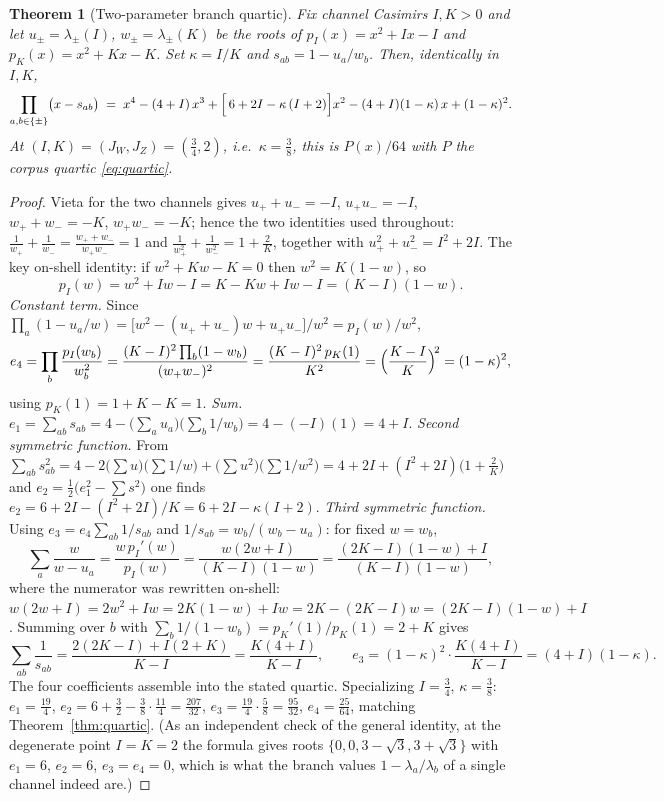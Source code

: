 \documentclass[11pt,a4paper]{article}
\newtheorem{theorem}{Theorem}
\theoremstyle{definition}
\begin{document}
\begin{theorem}[Two-parameter branch quartic]
\label{thm:family}
Fix channel Casimirs $I,K>0$ and let $u_\pm=\lambda_\pm(I)$,
$w_\pm=\lambda_\pm(K)$ be the roots of $p_I(x)=x^2+Ix-I$ and
$p_K(x)=x^2+Kx-K$. Set $\kappa=I/K$ and $s_{ab}=1-u_a/w_b$. Then,
identically in $I,K$,
\[
\prod_{a,b\in\{\pm\}}\bigl(x-s_{ab}\bigr)
\;=\;
x^4-(4+I)\,x^3
+\Bigl[\,6+2I-\kappa\,(I+2)\Bigr]x^2
-(4+I)(1-\kappa)\,x
+(1-\kappa)^2 .
\]
At $(I,K)=(J_W,J_Z)=(\tfrac34,2)$, i.e.\ $\kappa=\tfrac38$, this is
$P(x)/64$ with $P$ the corpus quartic \eqref{eq:quartic}.
\end{theorem}

\begin{proof}
Vieta for the two channels gives $u_++u_-=-I$, $u_+u_-=-I$,
$w_++w_-=-K$, $w_+w_-=-K$; hence the two identities used throughout:
$\tfrac1{w_+}+\tfrac1{w_-}=\tfrac{w_++w_-}{w_+w_-}=1$ and
$\tfrac1{w_+^2}+\tfrac1{w_-^2}=1+\tfrac2K$, together with
$u_+^2+u_-^2=I^2+2I$. The key on-shell identity: if $w^2+Kw-K=0$ then
$w^2=K(1-w)$, so
\[
p_I(w)=w^2+Iw-I=K-Kw+Iw-I=(K-I)(1-w).
\]
\emph{Constant term.} Since
$\prod_a(1-u_a/w)=\bigl[w^2-(u_++u_-)w+u_+u_-\bigr]/w^2=p_I(w)/w^2$,
\[
e_4=\prod_b\frac{p_I(w_b)}{w_b^2}
=\frac{(K-I)^2\prod_b(1-w_b)}{(w_+w_-)^2}
=\frac{(K-I)^2\,p_K(1)}{K^2}
=\Bigl(\frac{K-I}{K}\Bigr)^{\!2}=(1-\kappa)^2,
\]
using $p_K(1)=1+K-K=1$.
\emph{Sum.} $e_1=\sum_{ab}s_{ab}
=4-\bigl(\sum_a u_a\bigr)\bigl(\sum_b 1/w_b\bigr)=4-(-I)(1)=4+I$.
\emph{Second symmetric function.} From
$\sum_{ab}s_{ab}^2
=4-2\bigl(\sum u\bigr)\bigl(\sum 1/w\bigr)
+\bigl(\sum u^2\bigr)\bigl(\sum 1/w^2\bigr)
=4+2I+(I^2+2I)\bigl(1+\tfrac2K\bigr)$
and $e_2=\tfrac12\bigl(e_1^2-\sum s^2\bigr)$ one finds
$e_2=6+2I-(I^2+2I)/K=6+2I-\kappa(I+2)$.
\emph{Third symmetric function.} Using $e_3=e_4\sum_{ab}1/s_{ab}$ and
$1/s_{ab}=w_b/(w_b-u_a)$: for fixed $w=w_b$,
\[
\sum_a\frac{w}{w-u_a}=\frac{w\,p_I'(w)}{p_I(w)}
=\frac{w(2w+I)}{(K-I)(1-w)}
=\frac{(2K-I)(1-w)+I}{(K-I)(1-w)},
\]
where the numerator was rewritten on-shell:
$w(2w+I)=2w^2+Iw=2K(1-w)+Iw=2K-(2K-I)w=(2K-I)(1-w)+I$. Summing over $b$
with
$\sum_b 1/(1-w_b)=p_K'(1)/p_K(1)=2+K$ gives
\[
\sum_{ab}\frac1{s_{ab}}
=\frac{2(2K-I)+I(2+K)}{K-I}
=\frac{K(4+I)}{K-I},
\qquad
e_3=(1-\kappa)^2\cdot\frac{K(4+I)}{K-I}=(4+I)(1-\kappa).
\]
The four coefficients assemble into the stated quartic. Specializing
$I=\tfrac34$, $\kappa=\tfrac38$: $e_1=\tfrac{19}4$,
$e_2=6+\tfrac32-\tfrac38\cdot\tfrac{11}4=\tfrac{207}{32}$,
$e_3=\tfrac{19}4\cdot\tfrac58=\tfrac{95}{32}$,
$e_4=\tfrac{25}{64}$, matching Theorem~\ref{thm:quartic}. (As an
independent check of the general identity, at the degenerate point $I=K=2$
the formula gives roots $\{0,0,3-\sqrt3,3+\sqrt3\}$ with
$e_1=6$, $e_2=6$, $e_3=e_4=0$, which is what the branch values
$1-\lambda_a/\lambda_b$ of a single channel indeed are.)
\end{proof}
\end{document}
